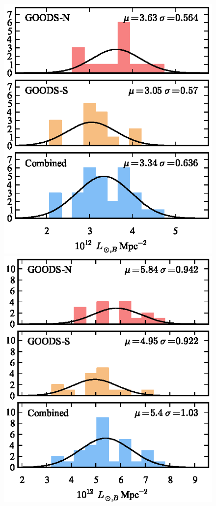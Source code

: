 \begin{figure}[p]
\includegraphics{figures/clrate/bkghist_all_V.eps}%
\includegraphics{figures/clrate/bkghist_all_S.eps}

\end{figure}
